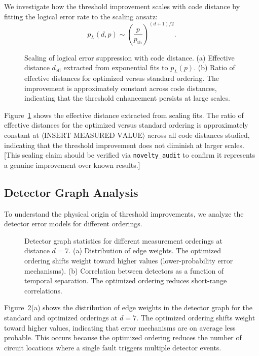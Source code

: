 \documentclass[
    reprint,
    aps,
    prx,
    superscriptaddress,
    longbibliography
]{revtex4-2}
\begin{document}
We investigate how the threshold improvement scales with code distance by fitting the logical error rate to the scaling ansatz:
\begin{equation}
    p_L(d, p) \sim \left(\frac{p}{p_{\text{th}}}\right)^{(d+1)/2}.
    \label{eq:scaling_ansatz}
\end{equation}

\begin{figure}[t]
    \caption{Scaling of logical error suppression with code distance. (a) Effective distance $d_{\text{eff}}$ extracted from exponential fits to $p_L(p)$. (b) Ratio of effective distances for optimized versus standard ordering. The improvement is approximately constant across code distances, indicating that the threshold enhancement persists at large scales.}
    \label{fig:scaling}
\end{figure}

Figure~\ref{fig:scaling} shows the effective distance extracted from scaling fits. The ratio of effective distances for the optimized versus standard ordering is approximately constant at $\langle\text{INSERT MEASURED VALUE}\rangle$ across all code distances studied, indicating that the threshold improvement does not diminish at larger scales. [This scaling claim should be verified via \texttt{novelty\_audit} to confirm it represents a genuine improvement over known results.]

\subsection{Detector Graph Analysis}
\label{subsec:detector_analysis}

To understand the physical origin of threshold improvements, we analyze the detector error models for different orderings.

\begin{figure}[t]
    \caption{Detector graph statistics for different measurement orderings at distance $d = 7$. (a) Distribution of edge weights. The optimized ordering shifts weight toward higher values (lower-probability error mechanisms). (b) Correlation between detectors as a function of temporal separation. The optimized ordering reduces short-range correlations.}
    \label{fig:detector_stats}
\end{figure}

Figure~\ref{fig:detector_stats}(a) shows the distribution of edge weights in the detector graph for the standard and optimized orderings at $d = 7$. The optimized ordering shifts weight toward higher values, indicating that error mechanisms are on average less probable. This occurs because the optimized ordering reduces the number of circuit locations where a single fault triggers multiple detector events.
\end{document}
